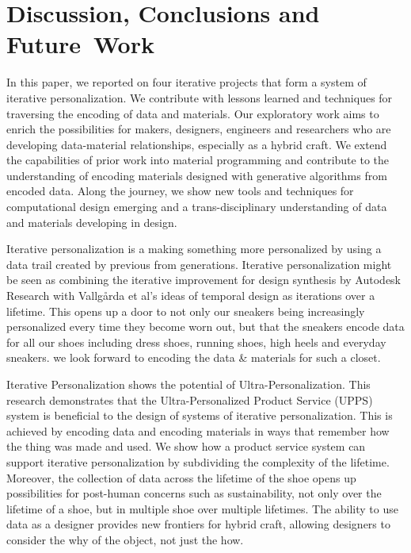 \section{Discussion, Conclusions and Future~Work}
In this paper, we reported on four iterative projects that form a system of iterative personalization. We contribute with lessons learned and techniques for traversing the encoding of data and materials. Our exploratory work aims to enrich the possibilities for makers, designers, engineers and researchers who are developing data-material relationships, especially as a hybrid craft. We extend the capabilities of prior work into material programming \cite{Vallgarda2016} and contribute to the understanding of encoding materials designed with generative algorithms from encoded data. Along the journey, we show new tools and techniques for computational design emerging and a trans-disciplinary understanding of data and materials developing in design. 

Iterative personalization is a making something more personalized by using a data trail created by previous from generations. Iterative personalization might be seen as combining the iterative improvement for design synthesis by Autodesk Research \cite{Nourbakhsh2016} with Vallg\aa rda et al's ideas of temporal design \cite{Vallgarda2015} as iterations over a lifetime.  This opens up a door to not only our sneakers being increasingly personalized every time they become worn out, but that the sneakers encode data for all our shoes including dress shoes, running shoes, high heels and everyday sneakers. we look forward to encoding the data \& materials for such a closet. 

Iterative Personalization shows the potential of Ultra-Personalization. 
This research demonstrates that the Ultra-Personalized Product Service (UPPS) system is beneficial to the design of systems of iterative personalization. This is achieved by encoding data and encoding materials in ways that remember how the thing was made and used. We show how a product service system can support iterative personalization by subdividing the complexity of the lifetime. Moreover, the collection of data across the lifetime of the shoe opens up possibilities for  post-human concerns such as sustainability, not only over the lifetime of a shoe, but in multiple shoe over multiple lifetimes. The ability to use data as a designer provides new frontiers for hybrid craft, allowing designers to consider the why of the object, not just the how. 

